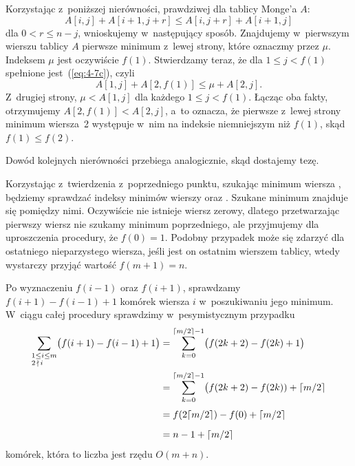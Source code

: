 \subproblem %
Korzystając z~poniższej nierówności, prawdziwej dla tablicy Monge'a $A$:
\begin{equation}
	A[i,j]+A[i+1,j+r] \le A[i,j+r]+A[i+1,j] \label{eq:4-7c}
\end{equation}
dla $0<r\le n-j$, wnioskujemy w~następujący sposób. Znajdujemy w~pierwszym wierszu tablicy $A$ pierwsze minimum z~lewej strony, które oznaczmy przez $\mu$. Indeksem $\mu$ jest oczywiście $f(1)$. Stwierdzamy teraz, że dla $1\le j<f(1)$ spełnione jest~(\ref{eq:4-7c}), czyli
\[
    A[1,j]+A[2,f(1)] \le \mu+A[2,j].
\]
Z~drugiej strony, $\mu<A[1,j]$ dla każdego $1\le j<f(1)$. Łącząc oba fakty, otrzymujemy $A[2,f(1)]<A[2,j]$, a~to oznacza, że pierwsze z~lewej strony minimum wiersza~2 występuje w~nim na indeksie niemniejszym niż $f(1)$, skąd $f(1)\le f(2)$.

Dowód kolejnych nierówności przebiega analogicznie, skąd dostajemy tezę.

\subproblem %
Korzystając z~twierdzenia z~poprzedniego punktu, szukając minimum wiersza , będziemy sprawdzać indeksy minimów wierszy  oraz . Szukane minimum znajduje się pomiędzy nimi. Oczywiście nie istnieje wiersz zerowy, dlatego przetwarzając pierwszy wiersz nie szukamy minimum poprzedniego, ale przyjmujemy dla uproszczenia procedury, że $f(0)=1$. Podobny przypadek może się zdarzyć dla ostatniego nieparzystego wiersza, jeśli jest on ostatnim wierszem tablicy, wtedy wystarczy przyjąć wartość $f(m+1)=n$.

Po wyznaczeniu $f(i-1)$ oraz $f(i+1)$, sprawdzamy $f(i+1)-f(i-1)+1$ komórek wiersza $i$ w~poszukiwaniu jego minimum. W~ciągu całej procedury sprawdzimy w~pesymistycznym przypadku
\begin{align*}
	\sum_{\begin{subarray}{l}1\le i\le m\\2\,\nmid\,i\end{subarray}}\bigl(f(i+1)-f(i-1)+1\bigr) &= \sum_{k=0}^{\lceil m/2\rceil-1}\bigl(f(2k+2)-f(2k)+1\bigr) \\
	&= \sum_{k=0}^{\lceil m/2\rceil-1}\bigl(f(2k+2)-f(2k))+\lceil m/2\rceil \\[1mm]
	&= f(2\lceil m/2\rceil)-f(0)+\lceil m/2\rceil \\[2mm]
	&= n-1+\lceil m/2\rceil
\end{align*}
komórek, która to liczba jest rzędu $O(m+n)$.

